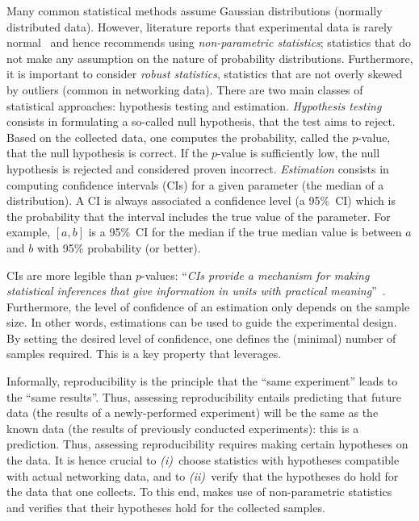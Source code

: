 Many common statistical methods assume Gaussian distributions (\ie normally distributed data).
However, literature reports that experimental data is rarely normal~\cite{maricq2018Taming,schmid2014measuring} and hence recommends using \emph{non-parametric statistics}; \ie statistics that do not make any assumption on the nature of probability distributions.
Furthermore, it is important to consider \emph{robust statistics}, \ie statistics that are not overly skewed by outliers (common in networking data).
There are two main classes of statistical approaches: hypothesis testing and estimation.
%
    \emph{Hypothesis testing} consists in formulating a so-called null hypothesis, that the test aims to reject. Based on the collected data, one computes the probability, called the \mbox{$p$-value}, that the null hypothesis is correct.
    If the \mbox{$p$-value} is sufficiently low, the null hypothesis is rejected and considered proven incorrect.
    \emph{Estimation} consists in computing confidence intervals (CIs) for a given parameter (\eg the median of a distribution).
    A CI is always associated a confidence level (\eg a 95\%~CI) which is the probability that the interval includes the true value of the parameter.
    For example, $[a,b]$ is a 95\%~CI for the median if the true median value is between $a$ and $b$ with 95\% probability (or better).
%

CIs are more legible than $p$-values: ``\textit{CIs provide a mechanism for making statistical inferences that give information in units with practical meaning}''~\cite{cumming2001CI}.
Furthermore, the level of confidence of an estimation only depends on the sample size. In other words, estimations can be used to guide the experimental design. By setting the desired level of confidence, one defines the (minimal) number of samples required.
This is a key property that \triscale leverages.

Informally, reproducibility is the principle that the ``same experiment'' leads to the ``same results''. Thus, assessing reproducibility entails predicting that future data (\ie the results of a newly-performed experiment) will be the same as the known data (\ie the results of previously conducted experiments): this is a prediction.
Thus, assessing reproducibility requires making certain hypotheses on the data.
It is hence crucial to \emph{(i)~}choose statistics with hypotheses compatible with actual networking data, and to \emph{(ii)~}verify that the hypotheses do hold for the data that one collects.
To this end, \triscale makes use of non-parametric statistics and verifies that their hypotheses hold for the collected samples.
